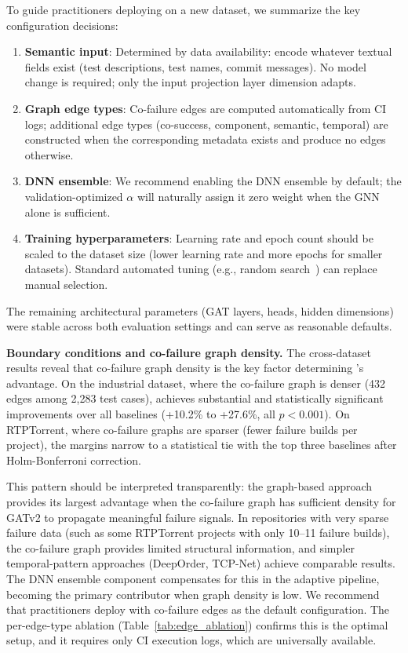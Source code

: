 To guide practitioners deploying \filopriori{} on a new dataset, we
summarize the key configuration decisions:
\begin{enumerate}
    \item \textbf{Semantic input}: Determined by data availability: encode
    whatever textual fields exist (test descriptions, test names, commit
    messages). No model change is required; only the input projection
    layer dimension adapts.
    \item \textbf{Graph edge types}: Co-failure edges are computed
    automatically from CI logs; additional edge types (co-success, component,
    semantic, temporal) are constructed when the corresponding metadata exists
    and produce no edges otherwise.
    \item \textbf{DNN ensemble}: We recommend enabling the DNN ensemble by
    default; the validation-optimized $\alpha$ will naturally assign it zero
    weight when the GNN alone is sufficient.
    \item \textbf{Training hyperparameters}: Learning rate and epoch count
    should be scaled to the dataset size (lower learning rate and more epochs
    for smaller datasets). Standard automated tuning (e.g., random
    search~\cite{bergstra2012random}) can replace manual selection.
\end{enumerate}
The remaining architectural parameters (GAT layers, heads, hidden dimensions)
were stable across both evaluation settings and can serve as reasonable
defaults.

\textbf{Boundary conditions and co-failure graph density.} The cross-dataset
results reveal that co-failure graph density is the key factor determining
\filopriori{}'s advantage. On the industrial dataset, where the co-failure
graph is denser (432 edges among 2,283 test cases), \filopriori{} achieves
substantial and statistically significant improvements over all baselines
(+10.2\% to +27.6\%, all $p < 0.001$). On RTPTorrent, where co-failure
graphs are sparser (fewer failure builds per project), the margins narrow
to a statistical tie with the top three baselines after Holm-Bonferroni
correction.

This pattern should be interpreted transparently: the graph-based approach
provides its largest advantage when the co-failure graph has sufficient
density for GATv2 to propagate meaningful failure signals. In repositories
with very sparse failure data (such as some RTPTorrent projects with only
10--11 failure builds), the co-failure graph provides limited structural
information, and simpler temporal-pattern approaches (DeepOrder, TCP-Net)
achieve comparable results. The DNN ensemble component compensates for
this in the adaptive pipeline, becoming the primary contributor when graph
density is low. We recommend that practitioners deploy \filopriori{} with
co-failure edges as the default configuration. The per-edge-type ablation
(Table~\ref{tab:edge_ablation}) confirms this is the optimal setup, and
it requires only CI execution logs, which are universally available.

